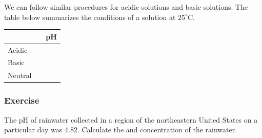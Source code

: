 \documentclass[12pt]{article}
\newcommand\T{\rule{0pt}{5.0ex}}       %
\newcommand\B{\rule[-4.0ex]{0pt}{0pt}} %
\begin{document}
\noindent We can follow similar procedures for acidic solutions and basic solutions. The table below summarizes the conditions of a solution at $25^{\circ}$C.

\begin{center}
\begin{tabularx}{0.8\textwidth}{| >{\centering\arraybackslash}X | >{\centering\arraybackslash}X | >{\centering\arraybackslash}X |}
\hline
   & [\ce{H+}] & pH \T\B \\
 \hline
 Acidic	 &  & \T\B \\  
 \hline
 Basic  &  & \T\B \\
  \hline
 Neutral &  &  \T\B \\
  \hline
\end{tabularx}
\end{center}

\subsubsection{Exercise}

The pH of rainwater collected in a region of the northeastern United States on a particular day was 4.82. Calculate the  and  concentration of the rainwater.

\newpage
\end{document}
